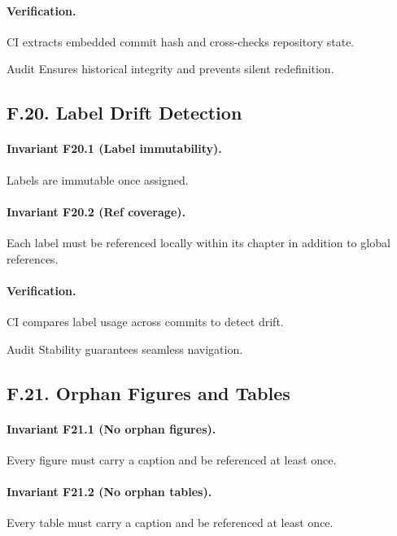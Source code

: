 \paragraph{Verification.}
CI extracts embedded commit hash and cross-checks repository state.

\begin{auditblock}{Audit}
Ensures historical integrity and prevents silent redefinition.
\end{auditblock}

\subsection*{F.20. Label Drift Detection}

\paragraph{Invariant F20.1 (Label immutability).}
Labels are immutable once assigned.

\paragraph{Invariant F20.2 (Ref coverage).}
Each label must be referenced locally within its chapter in addition to
global references.

\paragraph{Verification.}
CI compares label usage across commits to detect drift.

\begin{auditblock}{Audit}
Stability guarantees seamless navigation.
\end{auditblock}

\subsection*{F.21. Orphan Figures and Tables}

\paragraph{Invariant F21.1 (No orphan figures).}
Every figure must carry a caption and be referenced at least once.

\paragraph{Invariant F21.2 (No orphan tables).}
Every table must carry a caption and be referenced at least once.

